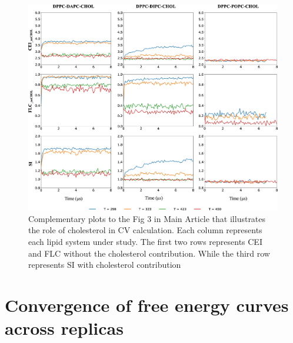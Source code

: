 \documentclass[10pt]{article}
\let\oldsection\section
\renewcommand{\section}{\clearpage\oldsection}
\begin{document}
\begin{figure}[H]
    \centering
    \includegraphics[width=6.5in]{Figures/Supplementary/RoleOfCHOL/placeholder.jpg}
    \caption{Complementary plots to the Fig 3 in Main Article that illustrates the role of cholesterol in CV calculation. Each column represents each lipid system under study. The first two rows represents CEI and FLC without the cholesterol contribution. While the third row represents SI with cholesterol contribution}
    \label{figss6:view}
\end{figure}

\section*{Convergence of free energy curves across replicas}
\end{document}
